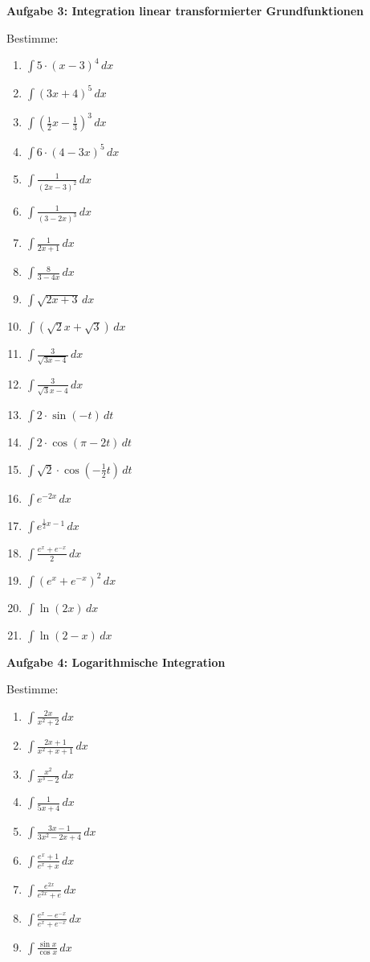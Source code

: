\documentclass[a4paper,12pt]{article}
\newcommand{\Aufgabe}[1]{
  {
  \vspace*{0.5cm}
  \textsf{\textbf{Aufgabe #1}}
  \vspace*{0.2cm}
  
  }
}
\begin{document}
\vspace{1cm}
\Aufgabe{3: Integration linear transformierter Grundfunktionen}
Bestimme:
\begin{enumerate}[label={\alph*)}, topsep=5pt,itemsep=4ex,partopsep=1ex,parsep=1ex]
  \item $\int 5\cdot (x-3)^4\,dx$
  \item $\int (3x+4)^5\,dx$
  \item $\int (\frac{1}{2}x-\frac{1}{3})^3\,dx$
  \item $\int 6\cdot (4-3x)^5\,dx$
  \item $\int \frac{1}{(2x-3)^2}\,dx$
  \item $\int \frac{1}{(3-2x)^3}\,dx$
  \item $\int \frac{1}{2x+1}\,dx$
  \item $\int \frac{8}{3-4x}\,dx$
  \item $\int \sqrt{2x+3}\,dx$
  \item $\int (\sqrt{2}x+\sqrt{3})\,dx$
  \item $\int \frac{3}{\sqrt{3x-4}}\,dx$
  \item $\int \frac{3}{\sqrt{3}x-4}\,dx$
  \item $\int 2\cdot \sin(-t)\,dt$
  \item $\int 2\cdot \cos(\pi-2t)\,dt$
  \item $\int \sqrt{2}\cdot \cos(-\frac{1}{2}t)\,dt$
  \item $\int e^{-2x}\,dx$
  \item $\int e^{\frac{1}{2}x-1}\,dx$
  \item $\int \frac{e^x+e^{-x}}{2}\,dx$
  \item $\int (e^x+e^{-x})^2\,dx$
  \item $\int \ln(2x)\,dx$
  \item $\int \ln(2-x)\,dx$
\end{enumerate}



\vspace{1cm}
\Aufgabe{4: Logarithmische Integration}
Bestimme:
\begin{enumerate}[label={\alph*)}, topsep=5pt,itemsep=4ex,partopsep=1ex,parsep=1ex]
  \item $\int \frac{2x}{x^2+2}\,dx$
  \item $\int \frac{2x+1}{x^2+x+1}\,dx$
  \item $\int \frac{x^2}{x^3-2}\,dx$
  \item $\int \frac{1}{5x+4}\,dx$
  \item $\int \frac{3x-1}{3x^2-2x+4}\,dx$
  \item $\int \frac{e^x+1}{e^x+x}\,dx$
  \item $\int \frac{e^{2x}}{e^{2x}+e}\,dx$
  \item $\int \frac{e^x-e^{-x}}{e^x+e^{-x}}\,dx$
  \item $\int \frac{\sin{x}}{\cos{x}}\,dx$
\end{enumerate}
\end{document}
